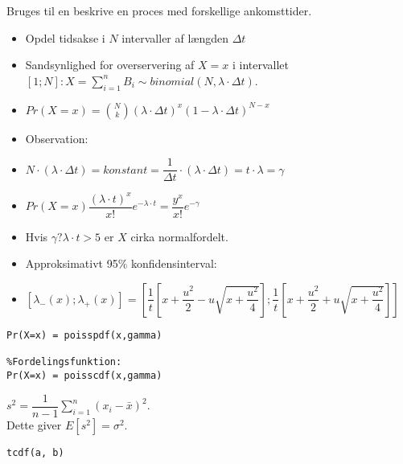 \documentclass[Main]{subfiles}
\begin{document}
\begin{theo}[Poissonfedeling]
Bruges til en beskrive en proces med forskellige ankomsttider.
\begin{itemize}
	\item Opdel tidsakse i $N$ intervaller af længden $\Delta t$
	
	\item Sandsynlighed for overservering af $X = x$ i intervallet $[1;N]: X = \sum_{i=1}^n B_i \sim binomial(N, \lambda \cdot \Delta t)$.
	
	\item[] $Pr(X=x) = \binom{N}{k}(\lambda \cdot \Delta t)^x(1-\lambda \cdot \Delta t)^{N-x}$
	
	\item Observation:
	
	\item[] $N \cdot (\lambda \cdot \Delta t) = konstant = \dfrac{1}{\Delta t} \cdot (\lambda \cdot \Delta t) = t \cdot \lambda = \gamma$
	
	\item[] $Pr(X=x) \dfrac{(\lambda \cdot t)^x}{x!} e^{-\lambda \cdot t} = \dfrac{y^x}{x!}e^{-\gamma} $

	\item Hvis $\gamma ? \lambda \cdot t > 5$ er $X$ cirka normalfordelt.

	\item Approksimativt 95\% konfidensinterval:
	\item[]$[\lambda_-(x);\lambda_+(x)] = \left[\dfrac{1}{t}\left[x+\dfrac{u^2}{2}-u \sqrt{x+\dfrac{u^2}{4}}\right] ; \dfrac{1}{t}\left[x+\dfrac{u^2}{2}+u \sqrt{x+\dfrac{u^2}{4}}\right] \right]$
\end{itemize}
\begin{lstlisting}[style=Code-Matlab]
%TEthedsfunktion:
Pr(X=x) = poisspdf(x,gamma)

%Fordelingsfunktion:
Pr(X=x) = poisscdf(x,gamma)
\end{lstlisting}
\end{theo}

\begin{theo}
$s^2 = \dfrac{1}{n-1} \sum_{i=1}^n (x_i - \bar{x})^2$.
\\
Dette giver $E[s^2] = \sigma^2$.
\end{theo}

\begin{lstlisting}[caption=P-værdi af ukendt varians, style=Code-Matlab]
tcdf(a, b)
\end{lstlisting}
\end{document}
